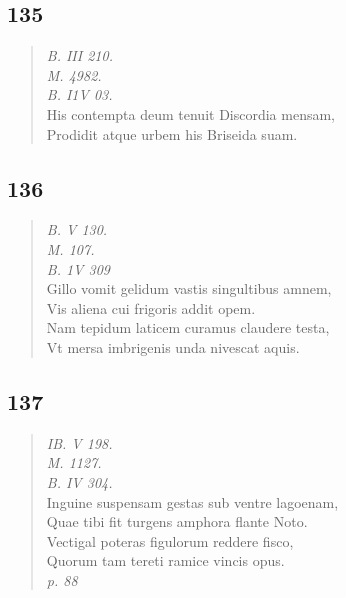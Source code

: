 \documentclass[11pt, a4paper]{report}
\begin{document}
            \subsection*{135}
      \begin{verse}
      \textit{B. III 210.} \\ \textit{M. 4982.} \\ \textit{B. I1V 03.} \\ His contempta deum tenuit Discordia mensam, \\ Prodidit atque urbem his Briseida suam. \\ 
      \end{verse}
  
            \subsection*{136}
      \begin{verse}
      \textit{B. V 130.} \\ \textit{M. 107.} \\ \textit{B. 1V 309} \\ Gillo vomit gelidum vastis singultibus amnem, \\ Vis aliena cui frigoris addit opem. \\ Nam tepidum laticem curamus claudere testa, \\ Vt mersa imbrigenis unda nivescat aquis. \\ 
      \end{verse}
  
            \subsection*{137}
      \begin{verse}
      \textit{IB. V 198.} \\ \textit{M. 1127.} \\ \textit{B. IV 304.} \\ Inguine suspensam gestas sub ventre lagoenam, \\ Quae tibi fit turgens amphora flante Noto. \\ Vectigal poteras figulorum reddere fisco, \\ Quorum tam tereti ramice vincis opus. \\ \textit{p. 88} \\ 
      \end{verse}
  
\end{document}
